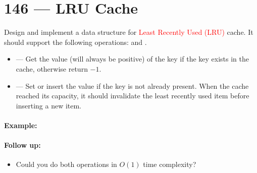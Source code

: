 \section{146 --- LRU Cache}
Design and implement a data structure for \textcolor{red}{Least Recently Used (LRU)} cache. It should support the following operations:  and .
\begin{itemize}
    \item {} --- Get the value (will always be positive) of the key if the key exists in the cache, otherwise return $-1$.
    \item {} --- Set or insert the value if the key is not already present. When the cache reached its capacity, it should invalidate the least recently used item before inserting a new item.
\end{itemize}
\paragraph{Example:}
\begin{flushleft}











\end{flushleft}
\paragraph{Follow up:}
\begin{itemize}
    \item Could you do both operations in $O(1)$ time complexity?
\end{itemize}

